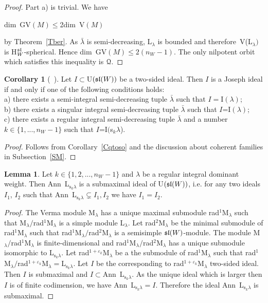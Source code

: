 \documentclass[12pt]{amsart}
\theoremstyle{definition}\newtheorem{theorem}{Theorem}[section]
\newtheorem{lemma}[proposition]{Lemma}
\newtheorem{corollary}[proposition]{Corollary}
\theoremstyle{definition}\newtheorem{definition}[proposition]{Definition}
\theoremstyle{remark}\newtheorem{example}[proposition]{Example}
\begin{document}
\begin{proof}Part a) is trivial. We have \begin{center}dim~GV$(M)\le$2dim~V$(M)$\end{center} by Theorem~\ref{Tber}. As $\bar\lambda$ is semi-decreasing, L$_\lambda$ is bounded and therefore~V(L$_\lambda)$ is H$_W^\frak{sl}$-spherical. Hence dim~GV$(M)\le 2(n_W-1)$. The only nilpotent orbit which satisfies this inequality is $\EuScript Q$.\end{proof}
\begin{corollary}[{~\cite[Table~3]{Jo3}}]\label{CJid} Let $I\subset$U$(\frak{sl}(W))$ be a two-sided ideal. Then $I$ is a Joseph ideal if and only if one of the following conditions holds:\\a) there exists a semi-integral semi-decreasing tuple $\bar\lambda$ such that $I=$I$(\lambda)$;\\b) there exists a singular integral semi-decreasing tuple $\bar\lambda$ such that $I$=I$(\lambda)$;\\c) there exists a regular integral semi-decreasing tuple $\bar\lambda$ and a number $k\in\{1,..., n_W-1\}$ such that $I$=I$($s$_k\lambda$).\end{corollary}
\begin{proof}Follows from Corollary~\ref{Cqtoso} and the discussion about coherent families in Subsection~\ref{SM}.\end{proof}
\begin{lemma} Let $k\in\{1, 2,..., n_W-1\}$ and $\lambda$ be a regular integral dominant weight. Then Ann~L$_{\mathrm s_k\lambda}$ is a submaximal ideal of U$(\frak{sl}(W))$, i.e. for any two ideals $I_1$, $I_2$ such that Ann~L$_{\mathrm s_k\lambda}\subsetneq I_1, I_2$ we have $I_1=I_2$.\end{lemma}
\begin{proof} The Verma module M$_\lambda$ has a unique maximal submodule rad$^1$M$_\lambda$ such that M$_\lambda/$rad$^1$M$_\lambda$ is a simple module L$_\lambda$. Let rad$^2$M$_\lambda$ be the minimal submodule of rad$^1$M$_\lambda$ such that rad$^1$M$_\lambda/$rad$^2$M$_\lambda$ is a semisimple $\frak{sl}(W)$-module. The module M$_\lambda/$rad$^1$M$_\lambda$ is finite-dimensional and rad$^1$M$_\lambda/$rad$^2$M$_\lambda$ has a unique submodule isomorphic to L$_{\mathrm s_k\lambda}$. Let rad$^{1+\varepsilon_k}$M$_\lambda$ be a the submodule of rad$^1$M$_\lambda$ such that rad$^1$M$_\lambda/$rad$^{1+\varepsilon_k}$M$_\lambda=$L$_{\mathrm s_k\lambda}$. Let $I$ be the corresponding to rad$^{1+\varepsilon_k}$M$_\lambda$ two-sided ideal. Then $I$ is submaximal and $I\subset$Ann~L$_{\mathrm s_k\lambda}$. As the unique ideal which is larger then $I$ is of finite codimension, we have Ann~L$_{\mathrm s_k\lambda}=I$. Therefore the ideal Ann~L$_{\mathrm s_k\lambda}$ is submaximal.\end{proof}
\end{document}
